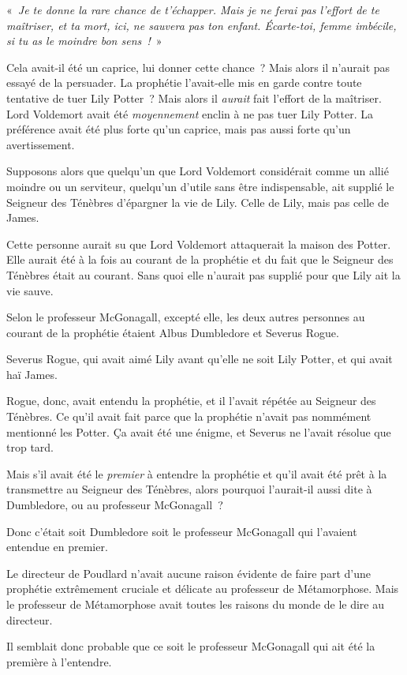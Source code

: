 «~\emph{Je te donne la rare chance de t'échapper. Mais je ne ferai pas l'effort de te maîtriser, et ta mort, ici, ne sauvera pas ton enfant. Écarte-toi, femme imbécile, si tu as le moindre bon sens~!}~»

Cela avait-il été un caprice, lui donner cette chance~? Mais alors il n'aurait pas essayé de la persuader. La prophétie l'avait-elle mis en garde contre toute tentative de tuer Lily Potter~? Mais alors il \emph{aurait} fait l'effort de la maîtriser. Lord Voldemort avait été \emph{moyennement} enclin à ne pas tuer Lily Potter. La préférence avait été plus forte qu'un caprice, mais pas aussi forte qu'un avertissement.

Supposons alors que quelqu'un que Lord Voldemort considérait comme un allié moindre ou un serviteur, quelqu'un d'utile sans être indispensable, ait supplié le Seigneur des Ténèbres d'épargner la vie de Lily. Celle de Lily, mais pas celle de James.

Cette personne aurait su que Lord Voldemort attaquerait la maison des Potter. Elle aurait été à la fois au courant de la prophétie et du fait que le Seigneur des Ténèbres était au courant. Sans quoi elle n'aurait pas supplié pour que Lily ait la vie sauve.

Selon le professeur McGonagall, excepté elle, les deux autres personnes au courant de la prophétie étaient Albus Dumbledore et Severus Rogue.

Severus Rogue, qui avait aimé Lily avant qu'elle ne soit Lily Potter, et qui avait haï James.

Rogue, donc, avait entendu la prophétie, et il l'avait répétée au Seigneur des Ténèbres. Ce qu'il avait fait parce que la prophétie n'avait pas nommément mentionné les Potter. Ça avait été une énigme, et Severus ne l'avait résolue que trop tard.

Mais s'il avait été le \emph{premier} à entendre la prophétie et qu'il avait été prêt à la transmettre au Seigneur des Ténèbres, alors pourquoi l'aurait-il aussi dite à Dumbledore, ou au professeur McGonagall~?

Donc c'était soit Dumbledore soit le professeur McGonagall qui l'avaient entendue en premier.

Le directeur de Poudlard n'avait aucune raison évidente de faire part d'une prophétie extrêmement cruciale et délicate au professeur de Métamorphose. Mais le professeur de Métamorphose avait toutes les raisons du monde de le dire au directeur.

Il semblait donc probable que ce soit le professeur McGonagall qui ait été la première à l'entendre.

